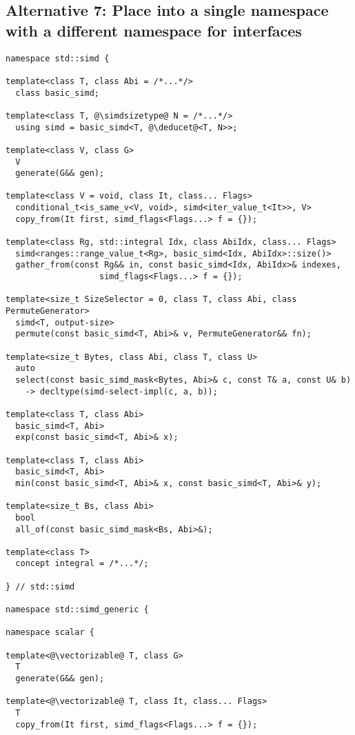 \subsection{Alternative 7: Place  into a single namespace with a different namespace for \simdgeneric interfaces}

\medskip\begin{lstlisting}[style=Vc]
namespace std::simd {

template<class T, class Abi = /*...*/>
  class basic_simd;

template<class T, @\simdsizetype@ N = /*...*/>
  using simd = basic_simd<T, @\deducet@<T, N>>;

template<class V, class G>
  V
  generate(G&& gen);

template<class V = void, class It, class... Flags>
  conditional_t<is_same_v<V, void>, simd<iter_value_t<It>>, V>
  copy_from(It first, simd_flags<Flags...> f = {});

template<class Rg, std::integral Idx, class AbiIdx, class... Flags>
  simd<ranges::range_value_t<Rg>, basic_simd<Idx, AbiIdx>::size()>
  gather_from(const Rg&& in, const basic_simd<Idx, AbiIdx>& indexes,
                   simd_flags<Flags...> f = {});

template<size_t SizeSelector = 0, class T, class Abi, class PermuteGenerator>
  simd<T, output-size>
  permute(const basic_simd<T, Abi>& v, PermuteGenerator&& fn);

template<size_t Bytes, class Abi, class T, class U>
  auto
  select(const basic_simd_mask<Bytes, Abi>& c, const T& a, const U& b)
    -> decltype(simd-select-impl(c, a, b));

template<class T, class Abi>
  basic_simd<T, Abi>
  exp(const basic_simd<T, Abi>& x);

template<class T, class Abi>
  basic_simd<T, Abi>
  min(const basic_simd<T, Abi>& x, const basic_simd<T, Abi>& y);

template<size_t Bs, class Abi>
  bool
  all_of(const basic_simd_mask<Bs, Abi>&);

template<class T>
  concept integral = /*...*/;

} // std::simd

namespace std::simd_generic {

namespace scalar {

template<@\vectorizable@ T, class G>
  T
  generate(G&& gen);

template<@\vectorizable@ T, class It, class... Flags>
  T
  copy_from(It first, simd_flags<Flags...> f = {});


\end{lstlisting}
